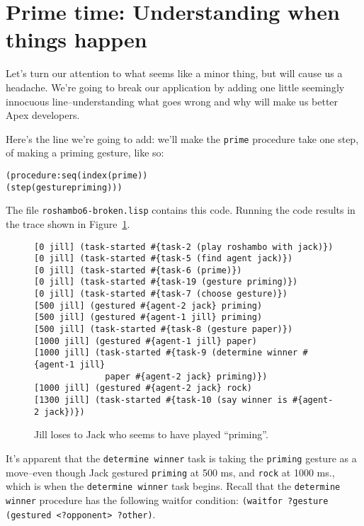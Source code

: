 \documentclass[12pt]{article}
\newcommand{\ic}{\texttt}
\newenvironment{code}%
   {\begin{alltt}}%
   {\end{alltt}}
\newenvironment{float}%
   {\begin{center}}%
   {\end{center}
   }
\begin{document}
\htmlpagebreak
\section{Prime time: Understanding when things happen}

Let's turn our attention to what seems like a minor thing, but will cause us a headache. We're going to break our application by adding one little seemingly innocuous line--understanding what goes wrong and why will make us better Apex developers. 

Here's the line we're going to add: we'll make the \ic{prime} procedure take one step, of making a priming gesture, like so:

\begin{code}
(procedure :seq (index (prime))
  (step (gesture priming)))
\end{code}

The file \ic{roshambo6-broken.lisp} contains this code. Running the code results in the trace shown in Figure~\ref{fig.roshambo.6.trace}. 

\begin{figure}
\begin{float}
\begin{verbatim}
[0 jill] (task-started #{task-2 (play roshambo with jack)})
[0 jill] (task-started #{task-5 (find agent jack)})
[0 jill] (task-started #{task-6 (prime)})
[0 jill] (task-started #{task-19 (gesture priming)})
[0 jill] (task-started #{task-7 (choose gesture)})
[500 jill] (gestured #{agent-2 jack} priming)
[500 jill] (gestured #{agent-1 jill} priming)
[500 jill] (task-started #{task-8 (gesture paper)})
[1000 jill] (gestured #{agent-1 jill} paper)
[1000 jill] (task-started #{task-9 (determine winner #{agent-1 jill} 
              paper #{agent-2 jack} priming)})
[1000 jill] (gestured #{agent-2 jack} rock)
[1300 jill] (task-started #{task-10 (say winner is #{agent-2 jack})})
\end{verbatim}
\end{float}
\caption{Jill loses to Jack who seems to have played ``priming''.\label{fig.roshambo.6.trace}}
\end{figure}


It's apparent that the \ic{determine winner} task is taking the \ic{priming} gesture as a move--even though Jack gestured \ic{priming} at 500 ms, and \ic{rock} at 1000 ms., which is when the \ic{determine winner} task begins. Recall that the \ic{determine winner} procedure has the following waitfor condition: \ic{(waitfor ?gesture (gestured <?opponent> ?other)}. 
\end{document}
